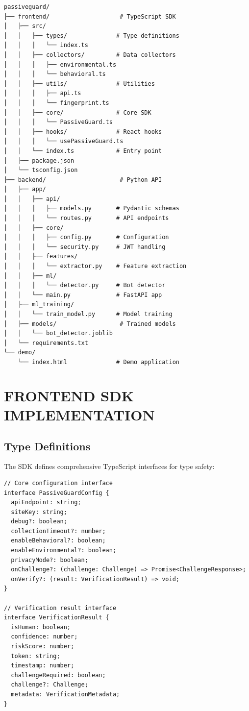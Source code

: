 \begin{verbatim}
passiveguard/
├── frontend/                    # TypeScript SDK
│   ├── src/
│   │   ├── types/              # Type definitions
│   │   │   └── index.ts
│   │   ├── collectors/         # Data collectors
│   │   │   ├── environmental.ts
│   │   │   └── behavioral.ts
│   │   ├── utils/              # Utilities
│   │   │   ├── api.ts
│   │   │   └── fingerprint.ts
│   │   ├── core/               # Core SDK
│   │   │   └── PassiveGuard.ts
│   │   ├── hooks/              # React hooks
│   │   │   └── usePassiveGuard.ts
│   │   └── index.ts            # Entry point
│   ├── package.json
│   └── tsconfig.json
├── backend/                     # Python API
│   ├── app/
│   │   ├── api/
│   │   │   ├── models.py       # Pydantic schemas
│   │   │   └── routes.py       # API endpoints
│   │   ├── core/
│   │   │   ├── config.py       # Configuration
│   │   │   └── security.py     # JWT handling
│   │   ├── features/
│   │   │   └── extractor.py    # Feature extraction
│   │   ├── ml/
│   │   │   └── detector.py     # Bot detector
│   │   └── main.py             # FastAPI app
│   ├── ml_training/
│   │   └── train_model.py      # Model training
│   ├── models/                  # Trained models
│   │   └── bot_detector.joblib
│   └── requirements.txt
└── demo/
    └── index.html              # Demo application
\end{verbatim}

\section{FRONTEND SDK IMPLEMENTATION}

\subsection{Type Definitions}

The SDK defines comprehensive TypeScript interfaces for type safety:

\begin{verbatim}
// Core configuration interface
interface PassiveGuardConfig {
  apiEndpoint: string;
  siteKey: string;
  debug?: boolean;
  collectionTimeout?: number;
  enableBehavioral?: boolean;
  enableEnvironmental?: boolean;
  privacyMode?: boolean;
  onChallenge?: (challenge: Challenge) => Promise<ChallengeResponse>;
  onVerify?: (result: VerificationResult) => void;
}

// Verification result interface
interface VerificationResult {
  isHuman: boolean;
  confidence: number;
  riskScore: number;
  token: string;
  timestamp: number;
  challengeRequired: boolean;
  challenge?: Challenge;
  metadata: VerificationMetadata;
}
\end{verbatim}

